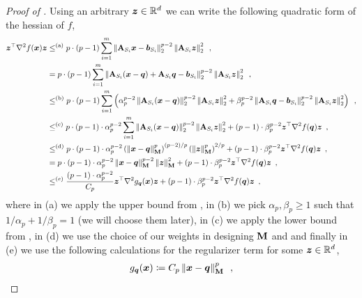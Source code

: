 \begin{proof}[Proof of ]
    Using an arbitrary $\bm{z}\in\mathbb{R}^d$ we can write the following quadratic form of the hessian of $f$,
    \begin{align}
        \bm{z}^{\top}\nabla^2 f(\bm{x})\bm{z} &\le^{\text{(a)}} p\cdot(p-1)\sum_{i=1}^m\left\lVert \mathbf{A}_{S_i}\bm{x} - \bm{b}_{S_i} \right\rVert_2^{p-2}\left\lVert \mathbf{A}_{S_i}\bm{z} \right\rVert_2^2\enspace,\nonumber\\
        &= p\cdot(p-1)\sum_{i=1}^m\left\lVert \mathbf{A}_{S_i}(\bm{x} - \bm{q}) + \mathbf{A}_{S_i}\bm{q} - \bm{b}_{S_i} \right\rVert_2^{p-2}\left\lVert \mathbf{A}_{S_i}\bm{z} \right\rVert_2^2\enspace,\nonumber\\
        &\leq^{\text{(b)}}  p\cdot(p-1)\sum_{i=1}^m\left(\alpha_p^{p-2}\left\lVert \mathbf{A}_{S_i}(\bm{x} - \bm{q}) \right\rVert_2^{p-2}\left\lVert \mathbf{A}_{S_i}\bm{z} \right\rVert_2^2 + \beta_p^{p-2}\left\lVert \mathbf{A}_{S_i}\bm{q} - \bm{b}_{S_i} \right\rVert_2^{p-2}\left\lVert \mathbf{A}_{S_i}\bm{z} \right\rVert_2^2\right)\enspace,\nonumber\\
        &\leq^{\text{(c)}}p\cdot(p-1)\cdot\alpha_p^{p-2}\sum_{i=1}^m\left\lVert \mathbf{A}_{S_i}(\bm{x} - \bm{q}) \right\rVert_2^{p-2}\left\lVert \mathbf{A}_{S_i}\bm{z} \right\rVert_2^2 + (p-1)\cdot\beta_p^{p-2}\bm{z}^{\top}\nabla^2f(\bm{q})\bm{z}\enspace,\nonumber\\
        &\leq^{\text{(d)}}p\cdot(p-1)\cdot\alpha_p^{p-2}\left(\left\lVert \bm{x}-\bm{q} \right\rVert^p_{\mathbf{M}}\right)^{(p-2)/p}\left(\left\lVert \bm{z} \right\rVert^p_{\mathbf{M}}\right)^{2/p}+ (p-1)\cdot\beta_p^{p-2}\bm{z}^{\top}\nabla^2f(\bm{q})\bm{z}\enspace,\nonumber\\
        &= p\cdot(p-1)\cdot\alpha_p^{p-2}\left\lVert \bm{x}-\bm{q} \right\rVert^{p-2}_{\mathbf{M}}\left\lVert \bm{z} \right\rVert^2_{\mathbf{M}} + (p-1)\cdot\beta_p^{p-2}\bm{z}^{\top}\nabla^2f(\bm{q})\bm{z}\enspace,\nonumber\\
        &\leq^{(e)} \frac{(p-1)\cdot \alpha_p^{p-2}}{C_p} \bm{z}^{\top}\nabla^2g_{\bm{q}}(\bm{x})\bm{z} + (p-1)\cdot\beta_p^{p-2}\bm{z}^{\top}\nabla^2f(\bm{q})\bm{z}\enspace,\label{eq:quad_form_f_ub}
    \end{align}
    where in (a) we apply the upper bound from , in (b) we pick $\alpha_p,\beta_p\geq 1$ such that $1/\alpha_p + 1/\beta_p = 1$ (we will choose them later), in (c) we apply the lower bound from , in (d) we use the choice of our weights in designing $\mathbf{M}$ and  and finally in (e) we use the following calculations for the regularizer term for some $\bm{z}\in\mathbb{R}^d$,
    \begin{align*}
        g_{\vq}(\vx) &\coloneqq C_p\norm{\vx-\vq}^p_{\mM}\enspace,\\    

\end{align*}
\end{proof}
